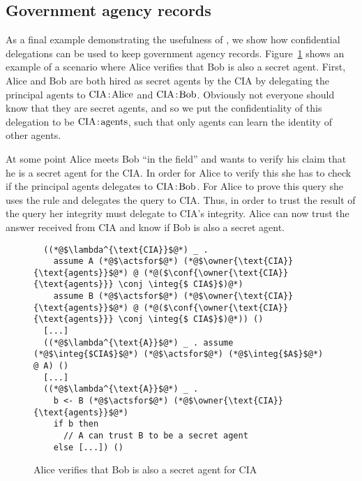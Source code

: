 \subsection{Government agency records}
As a final example demonstrating the usefulness of \lang, we show how confidential delegations can be used to keep government agency records. Figure~\ref{fig:govt-alice-checks-bob} shows an example of a scenario where Alice verifies that Bob is also a secret agent. First, Alice and Bob are both hired as secret agents by the CIA by delegating the principal $\text{agents}$ to $\text{CIA}\!:\!\text{Alice}$ and $\text{CIA}\!:\!\text{Bob}$. Obviously not everyone should know that they are secret agents, and so we put the confidentiality of this delegation to be $\text{CIA}\!:\!\text{agents}$, such that only agents can learn the identity of other agents.

At some point Alice meets Bob ``in the field'' and wants to verify his claim that he is a secret agent for the CIA. In order for Alice to verify this she has to check if the principal agents delegates to $\text{CIA}\!:\!\text{Bob}$. For Alice to prove this query she uses the  rule and delegates the query to CIA. Thus, in order to trust the result of the query her integrity must delegate to CIA's integrity.
Alice can now trust the answer received from CIA and know if Bob is also a secret agent.

\begin{figure}
\centering
\begin{lstlisting}
  ((*@$\lambda^{\text{CIA}}$@*) _ .
    assume A (*@$\actsfor$@*) (*@$\owner{\text{CIA}}{\text{agents}}$@*) @ (*@($\conf{\owner{\text{CIA}}{\text{agents}}} \conj \integ{$ CIA$}$)@*)
    assume B (*@$\actsfor$@*) (*@$\owner{\text{CIA}}{\text{agents}}$@*) @ (*@($\conf{\owner{\text{CIA}}{\text{agents}}} \conj \integ{$ CIA$}$)@*)) ()
  [...]
  ((*@$\lambda^{\text{A}}$@*) _ . assume (*@$\integ{$CIA$}$@*) (*@$\actsfor$@*) (*@$\integ{$A$}$@*) @ A) ()
  [...]
  ((*@$\lambda^{\text{A}}$@*) _ .
    b <- B (*@$\actsfor$@*) (*@$\owner{\text{CIA}}{\text{agents}}$@*)
    if b then
      // A can trust B to be a secret agent
    else [...]) ()
\end{lstlisting}
\caption{Alice verifies that Bob is also a secret agent for CIA}
\label{fig:govt-alice-checks-bob}
\end{figure}

